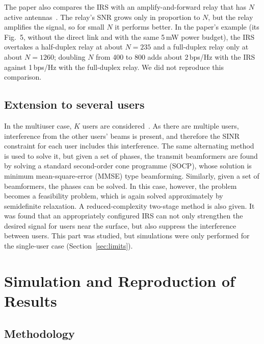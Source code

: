 \documentclass[11pt,a4paper]{article}
\begin{document}
The paper also compares the IRS with an amplify-and-forward relay that has $N$ active
antennas~\cite[Sec.~III-D, Prop.~3]{wu}. The relay's SNR grows only in proportion to $N$, but the relay
amplifies the signal, so for small $N$ it performs better. In the paper's example (its Fig.~5, without
the direct link and with the same 5\,mW power budget), the IRS overtakes a half-duplex relay at about
$N=235$ and a full-duplex relay only at about $N=1260$; doubling $N$ from 400 to 800 adds about
2\,bps/Hz with the IRS against 1\,bps/Hz with the full-duplex relay. We did not reproduce this
comparison.

\subsection{Extension to several users}

In the multiuser case, $K$ users are considered~\cite[Sec.~IV]{wu}. As there are multiple users, interference
from the other users' beams is present, and therefore the SINR constraint for each user includes this
interference. The same alternating method is used to solve it, but given a set of phases, the transmit
beamformers are found by solving a standard second-order cone programme (SOCP), whose solution is
minimum mean-square-error (MMSE) type beamforming. Similarly, given a set of beamformers, the phases
can be solved. In this case, however, the problem becomes a feasibility problem, which is again solved
approximately by semidefinite relaxation. A reduced-complexity two-stage method is also given. It was
found that an appropriately configured IRS can not only strengthen the desired signal for users near
the surface, but also suppress the interference between users. This part was studied, but simulations
were only performed for the single-user case (Section~\ref{sec:limits}).

\section{Simulation and Reproduction of Results}

\subsection{Methodology}
\label{sec:method}
\end{document}
